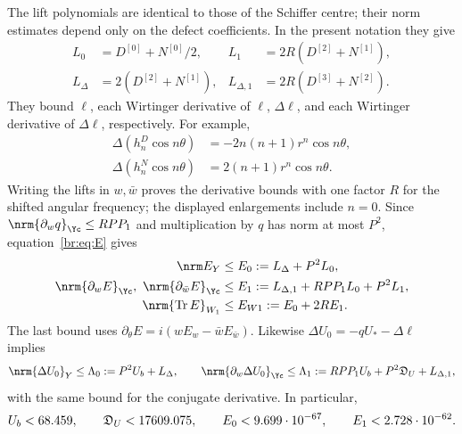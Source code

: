 The lift polynomials are identical to those of the Schiffer centre;
their norm estimates depend only on the defect coefficients. In the
present notation they give
\begin{equation}\label{br:eq:lift-constants}
 \begin{aligned}
 L_0&=D^{[0]}+N^{[0]}/2,&
 L_1&=2R(D^{[2]}+N^{[1]}),\\
 L_\Delta&=2(D^{[2]}+N^{[1]}),&
 L_{\Delta,1}&=2R(D^{[3]}+N^{[2]}).
 \end{aligned}
\end{equation}
They bound $\ell$, each Wirtinger derivative of $\ell$, $\Delta\ell$,
and each Wirtinger derivative of $\Delta\ell$, respectively.
For example,
\[
 \begin{split}
 \Delta(h_n^D\cos n\theta)&=-2n(n+1)r^n\cos n\theta,\\
 \Delta(h_n^N\cos n\theta)&=2(n+1)r^n\cos n\theta.
 \end{split}
\]
Writing the lifts in $w,\bar w$ proves the
derivative bounds with one factor $R$ for the shifted angular frequency;
the displayed enlargements include $n=0$.
Since $\nrm{\partial_wq}_{\Yc}\le RPP_1$ and multiplication by $q$
has norm at most $P^2$, equation~\eqref{br:eq:E} gives
\begin{equation}\label{br:eq:residual-bounds}
 \begin{split}
 \nrm E_Y&\le E_0:=L_\Delta+P^2L_0,\\
 \nrm{\partial_wE}_{\Yc},\ \nrm{\partial_{\bar w}E}_{\Yc}
 &\le E_1:=L_{\Delta,1}+RPP_1L_0+P^2L_1,\\
 \nrm{\operatorname{Tr}E}_{W_1}&\le E_{W1}:=E_0+2RE_1.
 \end{split}
\end{equation}
The last bound uses $\partial_\theta E=i(wE_w-\bar wE_{\bar w})$.
Likewise $\Delta U_0=-qU_*-\Delta\ell$ implies
\begin{equation}\label{br:eq:Lambda}
 \nrm{\Delta U_0}_Y\le\Lambda_0:=P^2U_b+L_\Delta,
 \qquad
 \nrm{\partial_w\Delta U_0}_{\Yc}\le
 \Lambda_1:=RPP_1U_b+P^2\mathfrak D_U+L_{\Delta,1},
\end{equation}
with the same bound for the conjugate derivative. In particular,
\begin{equation}\label{br:eq:residual-numbers}
 U_b<68.459,\qquad \mathfrak D_U<17609.075,\qquad
 E_0<9.699\cdot10^{-67},\qquad E_1<2.728\cdot10^{-62}.
\end{equation}

